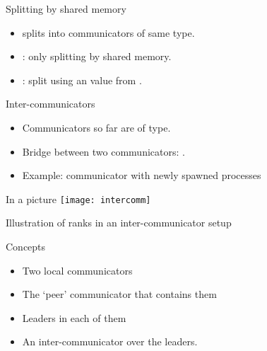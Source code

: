 \begin{exerciseframe}[procgrid]
  \footnotesize
  
\end{exerciseframe}

\begin{exerciseframe}
  
\end{exerciseframe}

\begin{numberedframe}{Splitting by shared memory}
  \begin{itemize}
  \item
     splits into communicators of same type.
  \item {}: only  splitting by
    shared memory.
  \item {}: 
    split using an  value from .
  \end{itemize}

\end{numberedframe}

\begin{numberedframe}{Inter-communicators}
\label{sl:comm-inter}
  \begin{itemize}
  \item Communicators so far are of  type.
  \item Bridge between two communicators: .
  \item Example: communicator with newly spawned processes
  \end{itemize}  
\end{numberedframe}

\begin{numberedframe}{In a picture}
  \label{sl:intercomm-picture}
  \texttt{[image: intercomm]}

  Illustration of ranks in an inter-communicator setup
  \tiny{}
\end{numberedframe}

\begin{numberedframe}{Concepts}
  \label{sl:intercomm-concepts}
  \begin{itemize}
  \item Two local communicators
  \item The `peer' communicator that contains them
  \item Leaders in each of them
  \item An inter-communicator over the leaders.
  \end{itemize}
\end{numberedframe}

